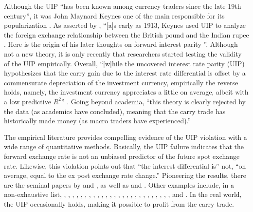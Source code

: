 \documentclass[a4paper, twoside]{templates/ociamthesis}
\begin{document}
Although the UIP ``has been known among currency traders since the late 19th century'', it was John Maynard Keynes one of the main responsible for its popularization \autocite[ 100]{bekaert2017}. As asserted by \textcite[ 144]{mehrling2010}, ``{[}a{]}s early as 1913, Keynes used UIP to analyze the foreign exchange relationship between the British pound and the Indian rupee \autocite{keynes1913}. Here is the origin of his later thoughts on forward interest parity \autocite*[ 124]{keynes1923}''. Although not a new theory, it is only recently that researchers started testing the validity of the UIP empirically. Overall, ``{[}w{]}hile the uncovered interest rate parity (UIP) hypothesizes that the carry gain due to the interest rate differential is offset by a commensurate depreciation of the investment currency, empirically the reverse holds, namely, the investment currency appreciates a little on average, albeit with a low predictive \(R^2\)'' \autocite[ 313]{brunnermeier2008}. Going beyond academia, ``this theory is clearly rejected by the data (as academics have concluded), meaning that the carry trade has historically made money (as macro traders have experienced).'' \autocite[ 185]{pedersen2015}

The empirical literature provides compelling evidence of the UIP violation with a wide range of quantitative methods. Basically, the UIP failure indicates that the forward exchange rate is not an unbiased predictor of the future spot exchange rate. Likewise, this violation points out that ``the interest differential is'' not, ``on average, equal to the ex post exchange rate change.'' \autocite[ 253]{flood2002} Pioneering the results, there are the seminal papers by \textcite{meese1983} and \textcite{fama1984}, as well as \textcite{hansen1980} and \textcite{cumby1981}. Other examples include, in a non-exhaustive list, \textcite{hodrick1987}, \textcite{cumby1988}, \textcite{bekaert1993}, \textcite{mccallum1994}, \textcite{bekaert1995}, \textcite{dumas1995}, \textcite{engel1996}, \textcite{flood1994}, \textcite{bansal1997}, \textcite{alexius2001}, \textcite{backus2001}, \textcite{flood2002}, \textcite{chaboud2005}, \textcite{chinn2005}, \textcite{brennan2006}, \textcite{sarno2006}, \textcite{bekaert2007}, \textcite{carvalho2009}, \textcite{craighead2010}, \textcite{lee2011}, \textcite{jiang2013}, \textcite{lothian2016}, \textcite{cieplinski2017}, \textcite{adewuyi2019}, \textcite{coulibaly2019}, \textcite{gali2020}, and \textcite{engel2021}. In the real world, the UIP occasionally holds, making it possible to profit from the carry trade.
\end{document}
